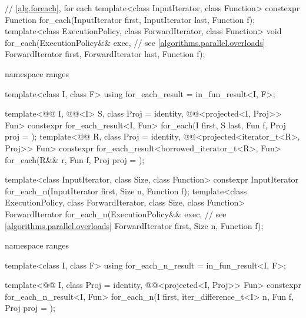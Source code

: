 \begin{codeblock}
{  // \ref{alg.foreach}, for each
  template<class InputIterator, class Function>
    constexpr Function for_each(InputIterator first, InputIterator last, Function f);
  template<class ExecutionPolicy, class ForwardIterator, class Function>
    void for_each(ExecutionPolicy&& exec,                       // see \ref{algorithms.parallel.overloads}
                  ForwardIterator first, ForwardIterator last, Function f);

  namespace ranges {
    template<class I, class F>
      using for_each_result = in_fun_result<I, F>;

    template<@@ I, @@<I> S, class Proj = identity,
             @@<projected<I, Proj>> Fun>
      constexpr for_each_result<I, Fun>
        for_each(I first, S last, Fun f, Proj proj = {});
    template<@@ R, class Proj = identity,
             @@<projected<iterator_t<R>, Proj>> Fun>
      constexpr for_each_result<borrowed_iterator_t<R>, Fun>
        for_each(R&& r, Fun f, Proj proj = {});
  }

  template<class InputIterator, class Size, class Function>
    constexpr InputIterator for_each_n(InputIterator first, Size n, Function f);
  template<class ExecutionPolicy, class ForwardIterator, class Size, class Function>
    ForwardIterator for_each_n(ExecutionPolicy&& exec,          // see \ref{algorithms.parallel.overloads}
                               ForwardIterator first, Size n, Function f);

  namespace ranges {
    template<class I, class F>
      using for_each_n_result = in_fun_result<I, F>;

    template<@@ I, class Proj = identity,
             @@<projected<I, Proj>> Fun>
      constexpr for_each_n_result<I, Fun>
        for_each_n(I first, iter_difference_t<I> n, Fun f, Proj proj = {});
  }

}
\end{codeblock}
